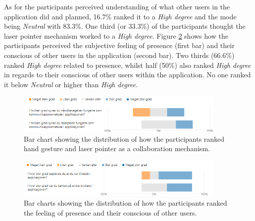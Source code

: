 As for the participants perceived understanding of what other users in the application did and planned, 16.7\% ranked it to a \textit{High degree} and the mode being \textit{Neutral} with 83.3\%. 
One third (or 33.3\%) of the participants thought the laser pointer mechanism worked to a \textit{High degree}. 
Figure \ref{fig:phase3_socialPresence} shows how the participants perceived the subjective feeling of presence (first bar) and their conscious of other users in the application (second bar). Two thirds (66.6\%) ranked \textit{High degree} related to presence, whilst half (50\%) also ranked \textit{High degree} in regards to their 
conscious of other users within the application. No one ranked it below \textit{Neutral} or higher than \textit{High degree}. 

\begin{figure}[H]
  \centering
   \captionsetup{width=.8\linewidth}
    \includegraphics[width=0.9\textwidth]{fig/phase_3/survey/collabMechanisimsGestureLaser.png}
 \caption{Bar chart showing the distribution of how the participants ranked hand gesture and laser pointer as a collaboration mechanism.}
\label{fig:phase3_CollabHandGestures}
\end{figure}


\begin{figure}[H]
  \centering
   \captionsetup{width=.8\linewidth}
    \includegraphics[width=0.9\textwidth]{fig/phase_3/survey/socialPrecense.png}
 \caption{Bar charts showing the distribution of how the participants ranked the feeling of presence and their 
conscious of other users.}
\label{fig:phase3_socialPresence}
\end{figure}



